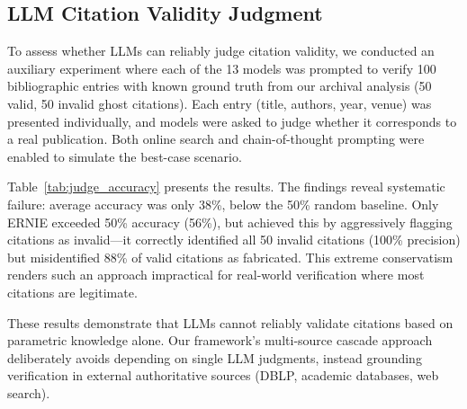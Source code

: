 \subsection{LLM Citation Validity Judgment}
\label{app:llm_judge}

To assess whether LLMs can reliably judge citation validity, we conducted an auxiliary experiment where each of the 13 models was prompted to verify 100 bibliographic entries with known ground truth from our archival analysis (50 valid, 50 invalid ghost citations).
Each entry (title, authors, year, venue) was presented individually, and models were asked to judge whether it corresponds to a real publication.
Both online search and chain-of-thought prompting were enabled to simulate the best-case scenario.



Table~\ref{tab:judge_accuracy} presents the results. The findings reveal systematic failure: average accuracy was only 38\%, below the 50\% random baseline. 
Only ERNIE exceeded 50\% accuracy (56\%), but achieved this by aggressively flagging citations as invalid---it correctly identified all 50 invalid citations (100\% precision) but misidentified 88\% of valid citations as fabricated.
This extreme conservatism renders such an approach impractical for real-world verification where most citations are legitimate.

These results demonstrate that LLMs cannot reliably validate citations based on parametric knowledge alone. Our \citeb framework's multi-source cascade approach deliberately avoids depending on single LLM judgments, instead grounding verification in external authoritative sources (DBLP, academic databases, web search).

